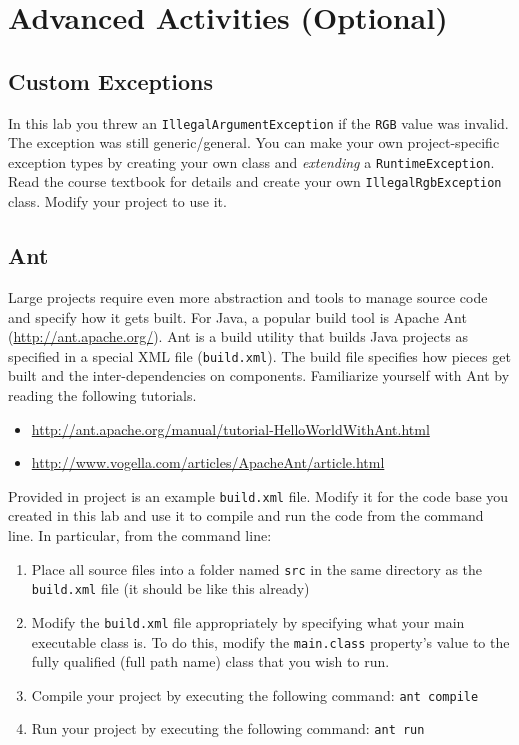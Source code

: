 \documentclass[12pt]{scrartcl}
\begin{document}
\section{Advanced Activities (Optional)}

\subsection{Custom Exceptions}

In this lab you threw an \texttt{IllegalArgumentException}
if the \texttt{RGB} value was invalid.  The exception was
still generic/general.  You can make your own project-specific 
exception types by creating your own class and \emph{extending} a
\texttt{RuntimeException}.  Read the course textbook for
details and create your own \texttt{IllegalRgbException}
class.  Modify your project to use it.

\subsection{Ant}

Large projects require even more abstraction and tools to manage source code 
and specify how it gets built.  For Java, a popular build tool is Apache Ant 
(\url{http://ant.apache.org/}).  Ant is a build utility that builds Java projects as 
specified in a special XML file (\texttt{build.xml}).  The build file specifies 
how pieces get built and the inter-dependencies on components.  Familiarize 
yourself with Ant by reading the following tutorials.
\begin{itemize}
  \item \url{http://ant.apache.org/manual/tutorial-HelloWorldWithAnt.html}
  \item \url{http://www.vogella.com/articles/ApacheAnt/article.html}
\end{itemize}
Provided in project is an example \texttt{build.xml} file.  Modify it for the 
code base you created in this lab and use it to compile and run the code from 
the command line.  In particular, from the command line:
\begin{enumerate}
  \item Place all source files into a folder named \texttt{src} in the
	same directory as the \texttt{build.xml} file (it should be like this already)
  \item Modify the \texttt{build.xml} file appropriately by specifying 
    what your main executable class is.  To do this, modify the \texttt{main.class}
    property's value to the fully qualified (full path name) class that you wish to run.
  \item Compile your project by executing the following command:
	\texttt{ant compile}
  \item Run your project by executing the following command:
	\texttt{ant run}
\end{enumerate}
\end{document}
